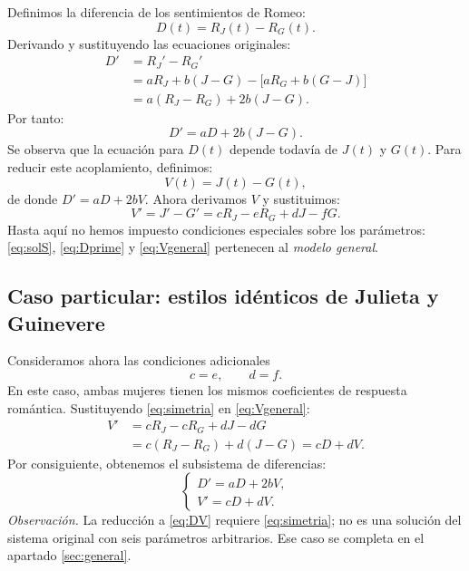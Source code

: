 \documentclass[10pt,letterpaper]{article}
\newcommand{\RJ}{R_{J}}
\newcommand{\RG}{R_{G}}
\begin{document}
Definimos la diferencia de los sentimientos de Romeo:
\begin{equation}\label{eq:defD}
D(t)=\RJ(t)-\RG(t).
\end{equation}
Derivando y sustituyendo las ecuaciones originales:
\begin{align}
D'&=\RJ'-\RG'\\
  &=a\RJ+b(J-G)-\bigl[a\RG+b(G-J)\bigr]\\
  &=a(\RJ-\RG)+2b(J-G).
\end{align}
Por tanto:
\begin{equation}\label{eq:Dprime}
\boxed{D'=aD+2b(J-G).}
\end{equation}
Se observa que la ecuación para $D(t)$ depende todavía de $J(t)$ y $G(t)$. Para reducir este acoplamiento, definimos:
\begin{equation}\label{eq:defV}
V(t)=J(t)-G(t),
\end{equation}
de donde $D'=aD+2bV$. Ahora derivamos $V$ y sustituimos:
\begin{equation}\label{eq:Vgeneral}
V'=J'-G'=c\RJ-e\RG+dJ-fG.
\end{equation}
Hasta aquí no hemos impuesto condiciones especiales sobre los parámetros: \eqref{eq:solS}, \eqref{eq:Dprime} y \eqref{eq:Vgeneral} pertenecen al \textit{modelo general}.

\subsection{Caso particular: estilos idénticos de Julieta y Guinevere}
Consideramos ahora las condiciones adicionales
\begin{equation}\label{eq:simetria}
\boxed{c=e,\qquad d=f.}
\end{equation}
En este caso, ambas mujeres tienen los mismos coeficientes de respuesta romántica. Sustituyendo \eqref{eq:simetria} en \eqref{eq:Vgeneral}:
\begin{align}
V'&=c\RJ-c\RG+dJ-dG\\
  &=c(\RJ-\RG)+d(J-G)=cD+dV.
\end{align}
Por consiguiente, obtenemos el subsistema de diferencias:
\begin{equation}\label{eq:DV}
\boxed{\begin{cases}
D'=aD+2bV,\\
V'=cD+dV.
\end{cases}}
\end{equation}
\textit{Observación.} La reducción a \eqref{eq:DV} requiere \eqref{eq:simetria}; no es una solución del sistema original con seis parámetros arbitrarios. Ese caso se completa en el apartado \ref{sec:general}.
\end{document}
